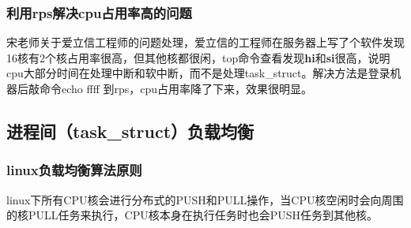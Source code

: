 \begin{Shaded}
\begin{Highlighting}[]
\OperatorTok{>}

\end{Highlighting}
\end{Shaded}

\hypertarget{header-n51}{%
\subsubsection{利用rps解决cpu占用率高的问题}\label{header-n51}}

宋老师关于爱立信工程师的问题处理，爱立信的工程师在服务器上写了个软件发现16核有2个核占用率很高，但其他核都很闲，top命令查看发现\textbf{hi}和\textbf{si}很高，说明cpu大部分时间在处理中断和软中断，而不是处理task\_struct。解决方法是登录机器后敲命令echo
ffff 到rps，cpu占用率降了下来，效果很明显。

\hypertarget{header-n56}{%
\subsection{进程间（task\_struct）负载均衡}\label{header-n56}}

\hypertarget{header-n57}{%
\subsubsection{linux负载均衡算法原则}\label{header-n57}}

linux下所有CPU核会进行分布式的PUSH和PULL操作，当CPU核空闲时会向周围的核PULL任务来执行，CPU核本身在执行任务时也会PUSH任务到其他核。

